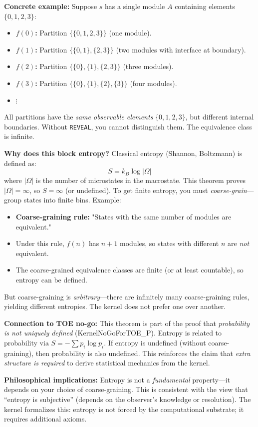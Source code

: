 \textbf{Concrete example:}
Suppose $s$ has a single module $A$ containing elements $\{0, 1, 2, 3\}$:
\begin{itemize}
    \item \textbf{$f(0)$:} Partition $\{\{0,1,2,3\}\}$ (one module).
    \item \textbf{$f(1)$:} Partition $\{\{0,1\}, \{2,3\}\}$ (two modules with interface at boundary).
    \item \textbf{$f(2)$:} Partition $\{\{0\}, \{1\}, \{2,3\}\}$ (three modules).
    \item \textbf{$f(3)$:} Partition $\{\{0\}, \{1\}, \{2\}, \{3\}\}$ (four modules).
    \item $\vdots$
\end{itemize}
All partitions have the \textit{same observable elements} $\{0,1,2,3\}$, but different internal boundaries. Without \texttt{REVEAL}, you cannot distinguish them. The equivalence class is infinite.

\textbf{Why does this block entropy?} Classical entropy (Shannon, Boltzmann) is defined as:
\[
S = k_B \log |\Omega|
\]
where $|\Omega|$ is the number of microstates in the macrostate. This theorem proves $|\Omega| = \infty$, so $S = \infty$ (or undefined). To get finite entropy, you must \textit{coarse-grain}---group states into finite bins. Example:
\begin{itemize}
    \item \textbf{Coarse-graining rule:} "States with the same number of modules are equivalent."
    \item Under this rule, $f(n)$ has $n+1$ modules, so states with different $n$ are \textit{not} equivalent.
    \item The coarse-grained equivalence classes are finite (or at least countable), so entropy can be defined.
\end{itemize}
But coarse-graining is \textit{arbitrary}---there are infinitely many coarse-graining rules, yielding different entropies. The kernel does not prefer one over another.

\textbf{Connection to TOE no-go:} This theorem is part of the proof that \textit{probability is not uniquely defined} (KernelNoGoForTOE\_P). Entropy is related to probability via $S = -\sum p_i \log p_i$. If entropy is undefined (without coarse-graining), then probability is also undefined. This reinforces the claim that \textit{extra structure is required} to derive statistical mechanics from the kernel.

\textbf{Philosophical implications:} Entropy is not a \textit{fundamental} property---it depends on your choice of coarse-graining. This is consistent with the view that ``entropy is subjective'' (depends on the observer's knowledge or resolution). The kernel formalizes this: entropy is not forced by the computational substrate; it requires additional axioms.


